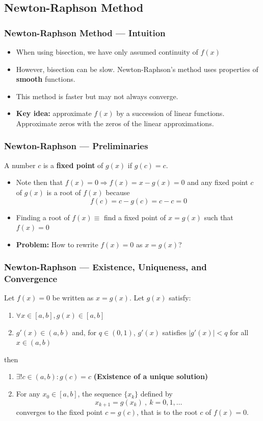 \documentclass[11pt,xcolor={svgnames},aspectratio=169,usepdftitle=false]{beamer}
\begin{document}
\subsection{Newton-Raphson Method}

\begin{frame}
  \frametitle{Newton-Raphson Method --- Intuition}
\begin{itemize}
  \item When using bisection, we have only assumed continuity of $f(x)$
  \item However, bisection can be slow. Newton-Raphson's method uses properties of \alert{\textbf{smooth}} functions.
  \item This method is faster but may not always converge.
  \item \alert{\textbf{Key idea:}} approximate $f(x)$ by a succession of linear functions. Approximate zeros with the zeros of the linear approximations.
\end{itemize}
\end{frame}

\begin{frame}
  \frametitle{Newton-Raphson --- Preliminaries}
\begin{definition}
A number $c$ is a \alert{\textbf{fixed point}} of $g(x)$ if $g(c) = c$.
\end{definition}
\begin{itemize}
  \item Note then that $f(x) = 0 \Rightarrow f(x) = x - g(x) = 0$ and any fixed point $c$ of $g(x)$ is a root of $f(x)$ because
  \[
  f(c) = c - g(c) = c - c = 0
  \]
  \item Finding a root of $f(x) \equiv$ find a fixed point of  $x = g(x)$ such that $f(x) = 0$
  \item \alert{\textbf{Problem:}} How to rewrite $f(x) = 0$ as $x = g(x)$?
\end{itemize}
\end{frame}

\begin{frame}
  \frametitle{Newton-Raphson --- Existence, Uniqueness, and Convergence}
\begin{theorem}\label{thm:fixed_point}
Let $f(x) = 0$ be written as $x = g(x)$. Let $g(x)$ satisfy:
\begin{enumerate}
  \item $\forall x\in [a,b], g(x)\in [a,b]$
  \item $g'(x)\in (a, b)$ and, for $q\in(0,1)$, $g'(x)$ satisfies $\lvert g'(x) \rvert < q$ for all $x\in (a,b)$
\end{enumerate}
then
\begin{enumerate}
  \item $\exists! c\in(a,b) : g(c) = c$ {\footnotesize \alert{\textbf{(Existence of a unique solution)}}}
  \item For any $x_0\in [a, b]$, the sequence $\{x_k\}$ defined by
  \[
  x_{k+1} = g(x_k) \ , \ k = 0,1,\ldots
  \]
  converges to the fixed point $c = g(c)$, that is to the root $c$ of $f(x) = 0$.
\end{enumerate}
\end{theorem}
\end{frame}
\end{document}
